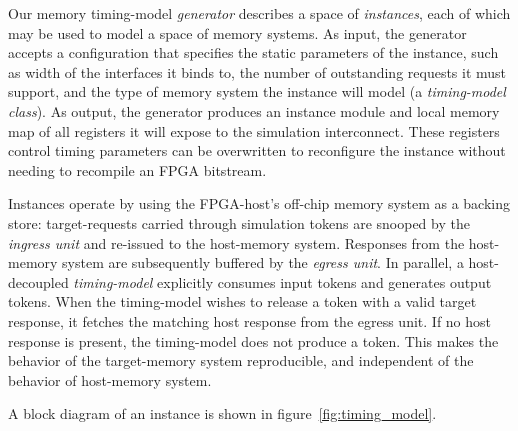 
Our memory timing-model \textit{generator} describes a space of
\textit{instances}, each of which may be used to model a space of
memory systems. As input, the generator accepts a configuration that specifies
the static parameters of the instance,  such as width of the interfaces it
binds to, the number of outstanding requests it must support, and the type of
memory system the instance will model (a \emph{timing-model class}). As output,
the generator produces an instance module and local memory map of all registers
it will expose to the simulation interconnect. These registers control timing
parameters can be overwritten to reconfigure the instance without needing to
recompile an FPGA bitstream.

Instances operate by using the FPGA-host's off-chip memory system as a backing
store: target-requests carried through simulation tokens are snooped by the
\emph{ingress unit} and re-issued to the host-memory system. Responses from the
host-memory system are subsequently buffered by the \emph{egress unit}. In
parallel, a host-decoupled \emph{timing-model} explicitly consumes input tokens
and generates output tokens. When the timing-model wishes to release a token
with a valid target response, it fetches the matching host response from the
egress unit. If no host response is present, the timing-model does not produce
a token. This makes the behavior of the target-memory system reproducible, and
independent of the behavior of host-memory system.

A block diagram of an instance is shown in figure~\ref{fig:timing_model}.

